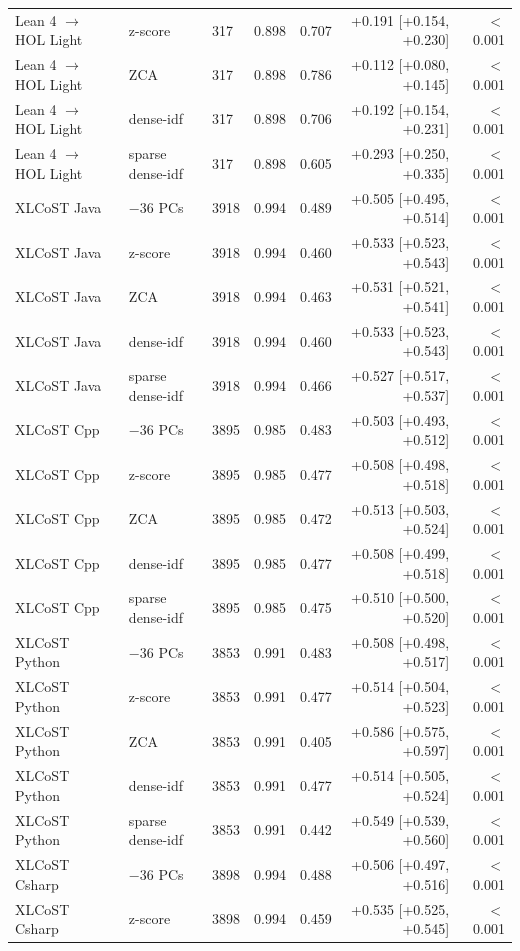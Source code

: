 \begin{longtable}{@{}lllrrrr@{}}
Lean 4 $\to$ HOL Light & z-score & 317 & 0.898 & 0.707 & +0.191 [+0.154, +0.230] & $<$0.001 \\
Lean 4 $\to$ HOL Light & ZCA & 317 & 0.898 & 0.786 & +0.112 [+0.080, +0.145] & $<$0.001 \\
Lean 4 $\to$ HOL Light & dense-idf & 317 & 0.898 & 0.706 & +0.192 [+0.154, +0.231] & $<$0.001 \\
Lean 4 $\to$ HOL Light & sparse dense-idf & 317 & 0.898 & 0.605 & +0.293 [+0.250, +0.335] & $<$0.001 \\
XLCoST Java & $-$36 PCs & 3918 & 0.994 & 0.489 & +0.505 [+0.495, +0.514] & $<$0.001 \\
XLCoST Java & z-score & 3918 & 0.994 & 0.460 & +0.533 [+0.523, +0.543] & $<$0.001 \\
XLCoST Java & ZCA & 3918 & 0.994 & 0.463 & +0.531 [+0.521, +0.541] & $<$0.001 \\
XLCoST Java & dense-idf & 3918 & 0.994 & 0.460 & +0.533 [+0.523, +0.543] & $<$0.001 \\
XLCoST Java & sparse dense-idf & 3918 & 0.994 & 0.466 & +0.527 [+0.517, +0.537] & $<$0.001 \\
XLCoST Cpp & $-$36 PCs & 3895 & 0.985 & 0.483 & +0.503 [+0.493, +0.512] & $<$0.001 \\
XLCoST Cpp & z-score & 3895 & 0.985 & 0.477 & +0.508 [+0.498, +0.518] & $<$0.001 \\
XLCoST Cpp & ZCA & 3895 & 0.985 & 0.472 & +0.513 [+0.503, +0.524] & $<$0.001 \\
XLCoST Cpp & dense-idf & 3895 & 0.985 & 0.477 & +0.508 [+0.499, +0.518] & $<$0.001 \\
XLCoST Cpp & sparse dense-idf & 3895 & 0.985 & 0.475 & +0.510 [+0.500, +0.520] & $<$0.001 \\
XLCoST Python & $-$36 PCs & 3853 & 0.991 & 0.483 & +0.508 [+0.498, +0.517] & $<$0.001 \\
XLCoST Python & z-score & 3853 & 0.991 & 0.477 & +0.514 [+0.504, +0.523] & $<$0.001 \\
XLCoST Python & ZCA & 3853 & 0.991 & 0.405 & +0.586 [+0.575, +0.597] & $<$0.001 \\
XLCoST Python & dense-idf & 3853 & 0.991 & 0.477 & +0.514 [+0.505, +0.524] & $<$0.001 \\
XLCoST Python & sparse dense-idf & 3853 & 0.991 & 0.442 & +0.549 [+0.539, +0.560] & $<$0.001 \\
XLCoST Csharp & $-$36 PCs & 3898 & 0.994 & 0.488 & +0.506 [+0.497, +0.516] & $<$0.001 \\
XLCoST Csharp & z-score & 3898 & 0.994 & 0.459 & +0.535 [+0.525, +0.545] & $<$0.001 \\

\end{longtable}
